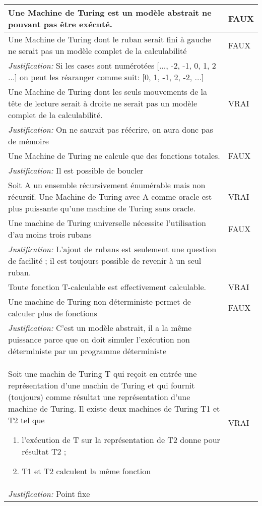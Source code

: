 \begin{longtable}{p{13cm}|l}
    Une Machine de Turing est un modèle abstrait ne pouvant pas être exécuté.& FAUX \\
     \hline
    Une Machine de Turing dont le ruban serait fini à gauche ne serait pas un modèle complet de la calculabilité & FAUX \\
       \textit{Justification:} Si les cases sont numérotées [..., -2, -1, 0, 1, 2 ...] on peut les réaranger comme suit: [0, 1, -1, 2, -2, ...] \\
     \hline
    Une Machine de Turing dont les seuls mouvements de la tête de lecture serait à droite ne serait pas un modèle complet de la calculabilité. & VRAI \\
       \textit{Justification:} On ne saurait pas réécrire, on aura donc pas de mémoire \\
     \hline
    Une Machine de Turing ne calcule que des fonctions totales. & FAUX \\
    \textit{Justification:} Il est possible de boucler & \\
     \hline
    Soit A un ensemble récursivement énumérable mais non récursif. Une Machine de Turing avec A comme oracle est plus puissante qu'une machine de Turing sans oracle. & VRAI \\
     \hline
    Une machine de Turing universelle nécessite l'utilisation d'au moins trois rubans & FAUX \\
    \textit{Justification:} L'ajout de rubans est seulement une question de facilité ; il est toujours possible de revenir à un seul ruban. & \\
     \hline
    Toute fonction T-calculable est effectivement calculable. & VRAI \\
     \hline
    Une machine de Turing non déterministe permet de calculer plus de fonctions & FAUX \\
       \textit{Justification:} C'est un modèle abstrait, il a la même puissance parce que on doit simuler l'exécution non déterministe par un programme déterministe \\
     \hline
    Soit une machin de Turing T qui reçoit en entrée une représentation d'une machin de Turing et qui fournit (toujours) comme résultat une représentation d'une machine de Turing. Il existe deux machines de Turing T1 et T2 tel que \begin{enumerate}
    \item l'exécution de T sur la représentation de T2 donne pour résultat T2 ;
    \item T1 et T2 calculent la même fonction
   \end{enumerate}
   & VRAI \\
    \textit{Justification:} Point fixe & \\

\end{longtable}
